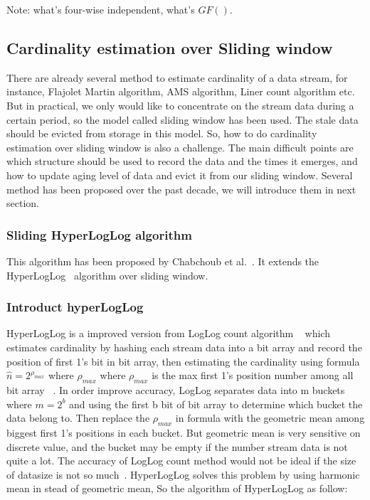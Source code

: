\documentclass{report}
\begin{document}
Note: what's four-wise independent, what's $GF()$.


\subsection{Cardinality estimation over Sliding window}
There are already several method to estimate cardinality of a data stream, for instance, Flajolet Martin algorithm, AMS algorithm, Liner count algorithm etc. But in practical, we only would like to concentrate on the stream data during a certain period, so the model called sliding window has been used. The stale data should be evicted from storage in this model. So, how to do cardinality estimation over sliding window is also a challenge. The main difficult points are which structure should be used to record the data and the times it emerges, and how to update aging level of data and evict it from our sliding window. Several method has been proposed over the past decade, we will introduce them in next section.

\subsubsection{Sliding HyperLogLog algorithm}

This algorithm has been proposed by Chabchoub et al.~\cite{chabchoub2010sliding}. It extends the HyperLogLog~\cite{flajolet2007hyperloglog} algorithm over sliding window. 
\subsubsection{Introduct hyperLogLog}
HyperLogLog is a improved version from LogLog count algorithm ~\cite{durand2003loglog} which estimates cardinality by hashing each stream data into a bit array and record the position of first 1's bit in bit array, then estimating the cardinality using formula $\hat{n} = 2^{\rho_{max}}$ where $\rho_{max}$ 
where $\rho_{max}$ is the max first 1's position number among all bit array ~\cite{durand2003loglog}. In order improve accuracy, LogLog separates data into m buckets where $m = 2^b$ and using the first b bit of bit array to determine which bucket the data belong to. Then replace the $\rho_{max}$ in formula with the geometric mean among biggest first 1's positions in each bucket. But geometric mean is very sensitive on discrete value, and the bucket may be empty if the number stream data is not quite a lot. The accuracy of LogLog count method would not be ideal if the size of datasize is not so much~\cite{durand2003loglog}. HyperLogLog solves this problem by using harmonic mean in stead of 
geometric mean, So the algorithm of HyperLogLog as follow:
\end{document}
